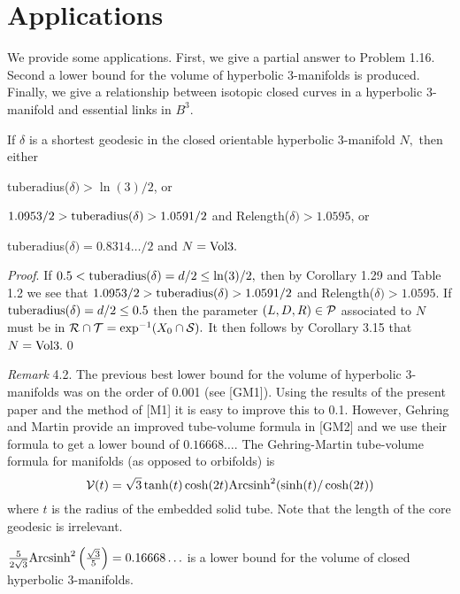 \section{Applications}
 
We provide some applications.  First, we give a partial answer to Problem 1.16.  Second a  lower bound for the volume of hyperbolic 3-manifolds is produced.  Finally, we give a relationship between isotopic closed curves in a hyperbolic 3-manifold and essential links in $B^3.$

 If $\delta$ is a shortest geodesic in
the closed orientable hyperbolic $3$\/{\rm -}\/manifold $N,$ then either
\begin{itemize}
 {\rm tuberadius(}$\delta) > \ln(3)/2${\rm ,} or
 
 $1.0953/2 > {\rm tuberadius}(\delta) > 1.0591/2$
and {\rm Relength(}$\delta) > 1.0595${\rm ,} or

 {\rm tuberadius(}$\delta) = 0.8314\ldots/2$ and $N = {\rm Vol3}.$
\end{itemize}
\endproclaim
        
{\it Proof}.  If 
$0.5 < {\rm tuberadius}(\delta)=d/2 \le \ln(3)/2,$ then by Corollary 1.29 and Table 1.2 we see that 
$1.0953/2 > {\rm tuberadius}(\delta) > 1.0591/2$
and Relength($\delta) > 1.0595.$
If ${\rm tuberadius}(\delta)=d/2 \le 0.5$ 
then the  parameter
$(L,D,R)\in {\cal P}$ 
associated to $N$ must be in 
${\cal R} \cap {\cal T} = \exp^{-1}(X_0 \cap {\cal S}).$ 
It then 
follows by Corollary 3.15 that $N = {\rm Vol3}.$\hfill\qed

 {\it Remark} 4.2.    The previous best lower bound for the volume of hyperbolic 3-manifolds was on the
order of 0.001 (see [GM1]).  Using the results of the present paper and the method of [M1] it is easy to improve this
to 0.1.  However, Gehring and Martin provide an improved tube-volume formula in [GM2] and we use their formula to
get a lower bound of $0.16668\ldots.$ The Gehring-Martin tube-volume formula for manifolds (as opposed to
orbifolds) is 
$${\cal V}(t) = \sqrt 3 \tanh(t) \cosh(2t) {\rm Arcsinh}^2(\sinh(t)/\cosh(2 t))$$
where $t$ is the radius of the embedded solid tube.  Note that the length of the core geodesic is irrelevant. 

 ${5 \over 2 \sqrt 3} {\rm Arcsinh}^2\left({ \sqrt 3 \over 5}\right) = 0.16668\ldots$
is a lower bound for the volume of closed hyperbolic $3$\/{\rm -}\/manifolds.
\endproclaim

